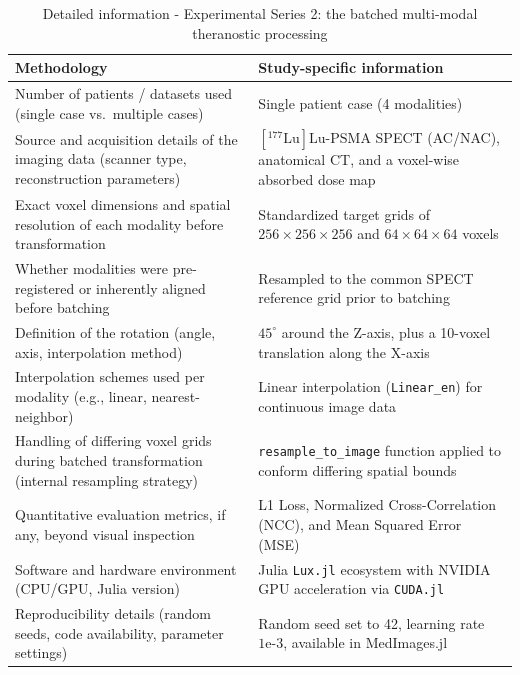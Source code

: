 \documentclass[a4paper,10pt]{elsarticle}
\begin{document}
\begin{table}[H]
\centering
\caption{Detailed information - Experimental Series 2: the batched multi-modal theranostic processing}
\label{tab:method_info_batched_Lu177}
\begin{tabular}{|p{}|p{}|}
\hline
\textbf{Methodology} & \textbf{Study-specific information} \\
\hline
Number of patients / datasets used (single case vs.\ multiple cases) & Single patient case (4 modalities) \\
\hline
Source and acquisition details of the imaging data (scanner type, reconstruction parameters) & $[^{177}\text{Lu}]\text{Lu-PSMA}$ SPECT (AC/NAC), anatomical CT, and a voxel-wise absorbed dose map \\
\hline
Exact voxel dimensions and spatial resolution of each modality before transformation & Standardized target grids of $256 \times 256 \times 256$ and $64 \times 64 \times 64$ voxels \\
\hline
Whether modalities were pre-registered or inherently aligned before batching & Resampled to the common SPECT reference grid prior to batching \\
\hline
Definition of the rotation (angle, axis, interpolation method) & $45^\circ$ around the Z-axis, plus a 10-voxel translation along the X-axis \\
\hline
Interpolation schemes used per modality (e.g., linear, nearest-neighbor) & Linear interpolation (\texttt{Linear\_en}) for continuous image data \\
\hline
Handling of differing voxel grids during batched transformation (internal resampling strategy) & \texttt{resample\_to\_image} function applied to conform differing spatial bounds \\
\hline
Quantitative evaluation metrics, if any, beyond visual inspection & L1 Loss, Normalized Cross-Correlation (NCC), and Mean Squared Error (MSE) \\
\hline
Software and hardware environment (CPU/GPU, Julia version) & Julia \texttt{Lux.jl} ecosystem with NVIDIA GPU acceleration via \texttt{CUDA.jl} \\
\hline
Reproducibility details (random seeds, code availability, parameter settings) & Random seed set to 42, learning rate $1\text{e-}3$, available in MedImages.jl \\
\hline
\end{tabular}
\end{table}
\end{document}
